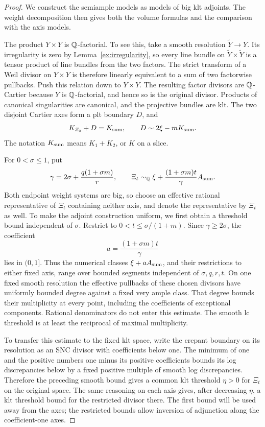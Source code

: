 \begin{proof}
We construct the semiample models as models of big klt adjoints.
The weight decomposition then gives both the volume formulas and
the comparison with the axis models.

The product \(Y\times Y\) is \(\mathbb{Q}\)-factorial. To see this, take a
smooth resolution \(\widetilde Y\to Y\). Its irregularity is zero by
Lemma~\ref{ex:irregularity}, so every line bundle on
\(\widetilde Y\times\widetilde Y\) is a tensor product of line bundles
from the two factors. The strict transform of a Weil divisor on
\(Y\times Y\) is therefore linearly equivalent to a sum of two
factorwise pullbacks. Push this relation down to \(Y\times Y\).
The resulting factor divisors are \(\mathbb{Q}\)-Cartier because \(Y\) is
\(\mathbb{Q}\)-factorial, and hence so is the original divisor. Products of
canonical singularities are canonical, and the projective bundles
are klt.  The two disjoint Cartier axes form a plt boundary \(D\),
and
\[
 K_{Z_0}+D=K_{\rm sum},\qquad
 D\sim2\xi-mK_{\rm sum}.
\]
The notation \(K_{\rm sum}\) means \(K_1+K_2\), or \(K\) on a slice.

For \(0<\sigma\le1\), put
\[
 \gamma=2\sigma+\frac{q(1+\sigma m)}r,\qquad
 \Xi_t\sim_{\mathbb{Q}}\xi+
       \frac{(1+\sigma m)t}{\gamma}A_{\rm sum}.
\]
Both endpoint weight systems are big, so choose an effective rational
representative of \(\Xi_t\) containing neither axis, and denote the
representative by \(\Xi_t\) as well.
To make the adjoint construction uniform, we first obtain a threshold
bound independent of \(\sigma\).
Restrict to \(0<t\le\sigma/(1+m)\).  Since \(\gamma\ge2\sigma\),
the coefficient
\[
 a=\frac{(1+\sigma m)t}{\gamma}
\]
lies in \((0,1]\).  Thus the numerical classes
\(\xi+aA_{\rm sum}\), and their restrictions to either fixed axis,
range over bounded segments independent of \(\sigma,q,r,t\).
On one fixed smooth resolution the effective pullbacks of these chosen
divisors have uniformly bounded degree against a fixed very ample class.
That degree bounds their multiplicity at every point, including
the coefficients of exceptional components.  Rational denominators
do not enter this estimate.  The smooth lc threshold is at least
the reciprocal of maximal multiplicity.

To transfer this estimate to the fixed klt space, write the crepant
boundary on its resolution as an SNC divisor with coefficients below one.
The minimum of
one and the positive numbers one minus its positive coefficients
bounds its log discrepancies below by a fixed positive multiple
of smooth log discrepancies.  Therefore the preceding smooth
bound gives a common klt threshold \(\eta>0\) for \(\Xi_t\) on the
original space. The same reasoning on each axis gives, after decreasing
\(\eta\), a klt threshold bound for the restricted divisor there.
The first bound will be used away from the axes; the restricted bounds
allow inversion of adjunction along the coefficient-one axes.


\end{proof}
